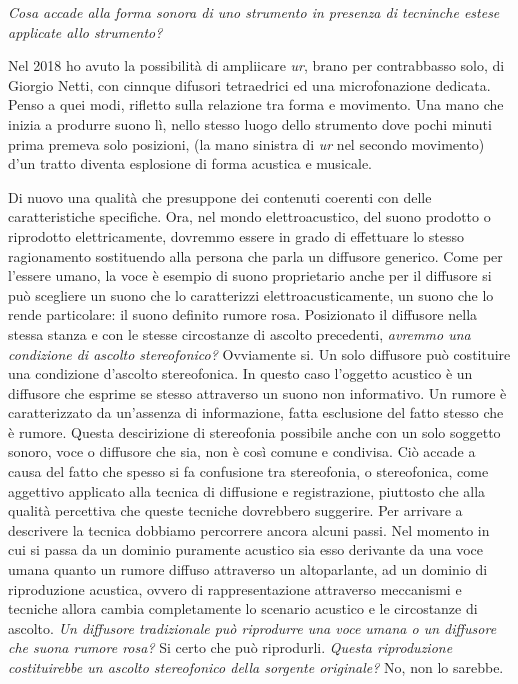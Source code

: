 \documentclass[a4paper,11pt]{article}
\begin{document}
\emph{Cosa accade alla forma sonora di uno strumento in presenza di tecninche
estese applicate allo strumento?}

Nel 2018 ho avuto la possibilità di ampliicare \emph{ur}, brano per
contrabbasso solo, di Giorgio Netti, con cinnque difusori tetraedrici ed
una microfonazione dedicata. Penso a quei modi, rifletto sulla relazione
tra forma e movimento. Una mano che inizia a produrre suono lì, nello
stesso luogo dello strumento dove pochi minuti prima premeva solo
posizioni, (la mano sinistra di \emph{ur} nel secondo movimento) d'un tratto
diventa esplosione di forma acustica e musicale.

Di nuovo una qualità che presuppone dei contenuti coerenti con delle
caratteristiche specifiche. Ora, nel mondo elettroacustico, del suono
prodotto o riprodotto elettricamente, dovremmo essere in grado di
effettuare lo stesso ragionamento sostituendo alla persona che parla un
diffusore generico. Come per l'essere umano, la voce è esempio di suono
proprietario anche per il diffusore si può scegliere un suono che lo
caratterizzi elettroacusticamente, un suono che lo rende particolare: il
suono definito rumore rosa. Posizionato il diffusore nella stessa stanza
e con le stesse circostanze di ascolto precedenti, \emph{avremmo una
condizione di ascolto stereofonico?} Ovviamente si. Un solo diffusore
può costituire una condizione d'ascolto stereofonica. In questo caso
l'oggetto acustico è un diffusore che esprime se stesso attraverso un
suono non informativo. Un rumore è caratterizzato da un'assenza di
informazione, fatta esclusione del fatto stesso che è rumore. Questa
descirizione di stereofonia possibile anche con un solo soggetto sonoro,
voce o diffusore che sia, non è così comune e condivisa. Ciò accade a
causa del fatto che spesso si fa confusione tra stereofonia, o
stereofonica, come aggettivo applicato alla tecnica di diffusione e
registrazione, piuttosto che alla qualità percettiva che queste tecniche
dovrebbero suggerire. Per arrivare a descrivere la tecnica dobbiamo
percorrere ancora alcuni passi. Nel momento in cui si passa da un
dominio puramente acustico sia esso derivante da una voce umana quanto
un rumore diffuso attraverso un altoparlante, ad un dominio di
riproduzione acustica, ovvero di rappresentazione attraverso meccanismi
e tecniche allora cambia completamente lo scenario acustico e le
circostanze di ascolto. \emph{Un diffusore tradizionale può riprodurre una
voce umana o un diffusore che suona rumore rosa?} Si certo che può
riprodurli. \emph{Questa riproduzione costituirebbe un ascolto stereofonico
della sorgente originale?} No, non lo sarebbe.
\end{document}
